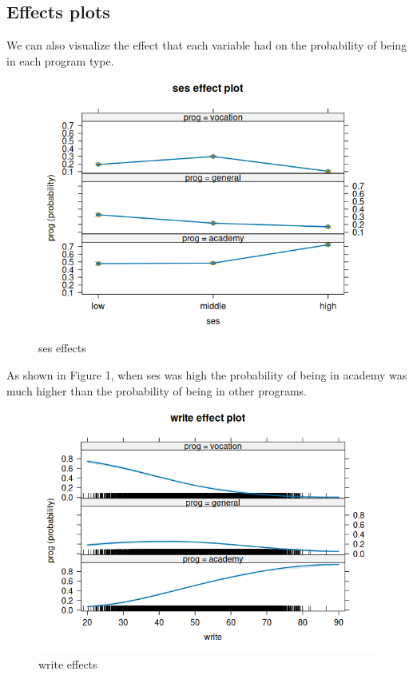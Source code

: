 \documentclass[12pt]{article}
\begin{document}
\clearpage
\subsection{Effects plots}

We can also visualize the effect that each variable had on the probability of being in each program type.

\begin{figure}[h]
\centering
\includegraphics[scale=0.7]{Rplot01.png}
\caption{ses effects}
\end{figure}


As shown in Figure 1, when ses was high the probability of being in academy was much higher than the probability of being in other programs.
 \clearpage
\begin{figure}[h]
\centering
\includegraphics[scale=0.7]{Rplot02.png}
\caption{write effects}
\end{figure}
\end{document}
